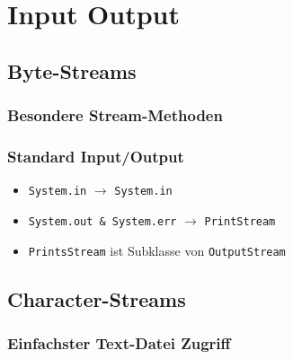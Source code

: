 \section*{Input Output}
	\subsection*{Byte-Streams}
		
		
		\begin{minipage}[t]{10cm}
			\subsubsection*{Besondere Stream-Methoden}
			
			
		\end{minipage}
		\hspace*{0.5cm}
		\begin{minipage}[t]{8.3cm}
			\subsubsection*{Standard Input/Output}	
			\begin{itemize}[noitemsep]
				\item \texttt{System.in} $\rightarrow$ \texttt{System.in}
				\item \texttt{System.out \& System.err} $\rightarrow$ \texttt{PrintStream}
				\item \texttt{PrintsStream} ist Subklasse von \texttt{OutputStream}
			\end{itemize}	
		\end{minipage}
	
	\subsection*{Character-Streams}
		
		
		\subsubsection*{Einfachster Text-Datei Zugriff}
		